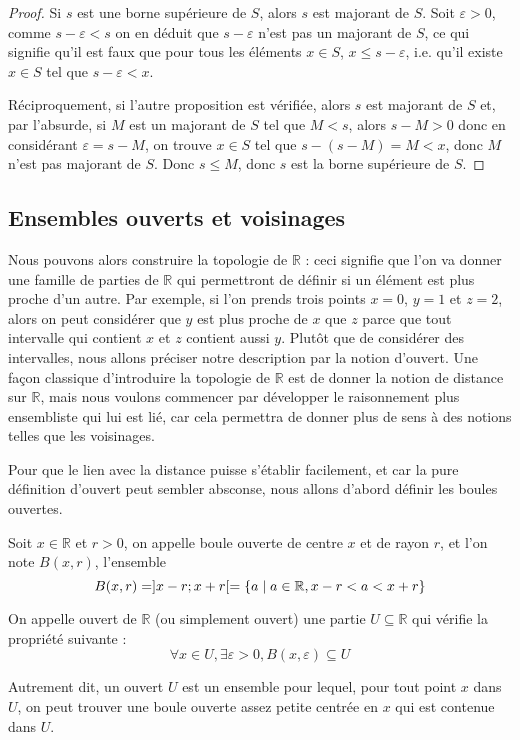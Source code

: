 \begin{proof}
    Si $s$ est une borne supérieure de $S$, alors $s$ est majorant de $S$. Soit $\varepsilon > 0$, comme $s-\varepsilon < s$ on en déduit que $s-\varepsilon$ n'est pas un majorant de $S$, ce qui signifie qu'il est faux que pour tous les éléments $x\in S$, $x \leq s-\varepsilon$, i.e. qu'il existe $x\in S$ tel que $s-\varepsilon < x$.

    Réciproquement, si l'autre proposition est vérifiée, alors $s$ est majorant de $S$ et, par l'absurde, si $M$ est un majorant de $S$ tel que $M < s$, alors $s - M > 0$ donc en considérant $\varepsilon = s - M$, on trouve $x\in S$ tel que $s-(s-M) = M < x$, donc $M$ n'est pas majorant de $S$. Donc $s\leq M$, donc $s$ est la borne supérieure de $S$.
\end{proof}

\subsection{Ensembles ouverts et voisinages}

Nous pouvons alors construire la topologie de $\mathbb R$ : ceci signifie que l'on va donner une famille de parties de $\mathbb R$ qui permettront de définir si un élément est plus proche d'un autre. Par exemple, si l'on prends trois points $x = 0$, $y = 1$ et $z = 2$, alors on peut considérer que $y$ est plus proche de $x$ que $z$ parce que tout intervalle qui contient $x$ et $z$ contient aussi $y$. Plutôt que de considérer des intervalles, nous allons préciser notre description par la notion d'ouvert. Une façon classique d'introduire la topologie de $\mathbb R$ est de donner la notion de distance sur $\mathbb R$, mais nous voulons commencer par développer le raisonnement plus ensembliste qui lui est lié, car cela permettra de donner plus de sens à des notions telles que les voisinages.

Pour que le lien avec la distance puisse s'établir facilement, et car la pure définition d'ouvert peut sembler absconse, nous allons d'abord définir les boules ouvertes.

\begin{defi}
    Soit $x\in\mathbb R$ et $r > 0$, on appelle boule ouverte de centre $x$ et de rayon $r$, et l'on note $B(x,r)$, l'ensemble $$B(x,r) = ]x-r;x+r[ = \{a\;|\;a\in \mathbb R, x-r < a < x+r\}$$
\end{defi}

\begin{defi}[Ouvert]
    On appelle ouvert de $\mathbb R$ (ou simplement ouvert) une partie $U\subseteq\mathbb R$ qui vérifie la propriété suivante : $$\forall x\in U, \exists \varepsilon > 0, B(x,\varepsilon) \subseteq U$$

    Autrement dit, un ouvert $U$ est un ensemble pour lequel, pour tout point $x$ dans $U$, on peut trouver une boule ouverte assez petite centrée en $x$ qui est contenue dans $U$.
\end{defi}

